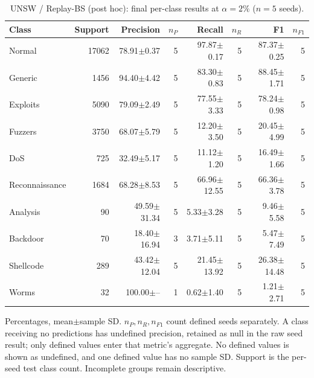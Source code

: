 \begin{table}[t]
\centering\scriptsize
\setlength{\tabcolsep}{3.3pt}
\caption{UNSW / Replay-BS (post hoc): final per-class results at $\alpha=2\%$ ($n=5$ seeds).}\label{tab:forgetting-class-unsw_nb15-replay-bs}
\begin{tabular}{lrrrrrrr}
\toprule
Class & Support & Precision & $n_P$ & Recall & $n_R$ & F1 & $n_{F1}$ \\
\midrule
Normal & 17062 & 78.91$\pm$0.37 & 5 & 97.87$\pm$0.17 & 5 & 87.37$\pm$0.25 & 5 \\
Generic & 1456 & 94.40$\pm$4.42 & 5 & 83.30$\pm$0.83 & 5 & 88.45$\pm$1.71 & 5 \\
Exploits & 5090 & 79.09$\pm$2.49 & 5 & 77.55$\pm$3.33 & 5 & 78.24$\pm$0.98 & 5 \\
Fuzzers & 3750 & 68.07$\pm$5.79 & 5 & 12.20$\pm$3.50 & 5 & 20.45$\pm$4.99 & 5 \\
DoS & 725 & 32.49$\pm$5.17 & 5 & 11.12$\pm$1.20 & 5 & 16.49$\pm$1.66 & 5 \\
Reconnaissance & 1684 & 68.28$\pm$8.53 & 5 & 66.96$\pm$12.55 & 5 & 66.36$\pm$3.78 & 5 \\
Analysis & 90 & 49.59$\pm$31.34 & 5 & 5.33$\pm$3.28 & 5 & 9.46$\pm$5.58 & 5 \\
Backdoor & 70 & 18.40$\pm$16.94 & 3 & 3.71$\pm$5.11 & 5 & 5.47$\pm$7.49 & 5 \\
Shellcode & 289 & 43.42$\pm$12.04 & 5 & 21.45$\pm$13.92 & 5 & 26.38$\pm$14.48 & 5 \\
Worms & 32 & 100.00$\pm$-- & 1 & 0.62$\pm$1.40 & 5 & 1.21$\pm$2.71 & 5 \\
\bottomrule
\end{tabular}
\par\smallskip\begin{minipage}{0.98\textwidth}\scriptsize Percentages, mean$\pm$sample SD. $n_P,n_R,n_{F1}$ count defined seeds separately. A class receiving no predictions has undefined precision, retained as null in the raw seed result; only defined values enter that metric's aggregate. No defined values is shown as undefined, and one defined value has no sample SD. Support is the per-seed test class count. Incomplete groups remain descriptive.\end{minipage}
\end{table}

